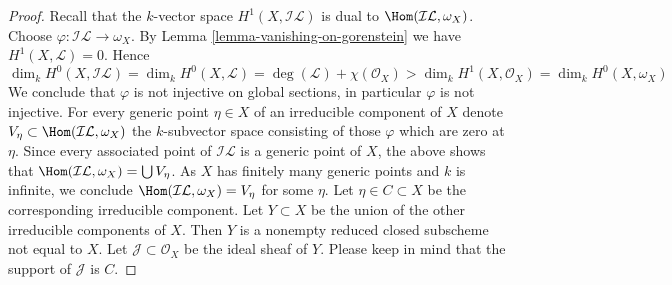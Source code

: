 \begin{proof}
\medskip\noindent
Recall that the $k$-vector space $H^1(X, \mathcal{I}\mathcal{L})$
is dual to $\Hom(\mathcal{I}\mathcal{L}, \omega_X)$.
Choose $\varphi : \mathcal{I}\mathcal{L} \to \omega_X$.
By Lemma \ref{lemma-vanishing-on-gorenstein} we have
$H^1(X, \mathcal{L}) = 0$. Hence
$$
\dim_k H^0(X, \mathcal{I}\mathcal{L}) = \dim_k H^0(X, \mathcal{L}) =
\deg(\mathcal{L}) + \chi(\mathcal{O}_X) > \dim_k H^1(X, \mathcal{O}_X) =
\dim_k H^0(X, \omega_X)
$$
We conclude that $\varphi$ is not injective on global sections, in particular
$\varphi$ is not injective. For every generic point $\eta \in X$
of an irreducible component of $X$ denote
$V_\eta \subset \Hom(\mathcal{I}\mathcal{L}, \omega_X)$ the $k$-subvector
space consisting of those $\varphi$ which are zero at $\eta$.
Since every associated point of $\mathcal{I}\mathcal{L}$
is a generic point of $X$, the above shows that
$\Hom(\mathcal{I}\mathcal{L}, \omega_X) = \bigcup V_\eta$.
As $X$ has finitely many generic points and $k$ is infinite, we conclude
$\Hom(\mathcal{I}\mathcal{L}, \omega_X) = V_\eta$ for some $\eta$.
Let $\eta \in C \subset X$ be the corresponding irreducible component.
Let $Y \subset X$ be the union of the other irreducible components
of $X$. Then $Y$ is a nonempty reduced closed subscheme not equal to $X$.
Let $\mathcal{J} \subset \mathcal{O}_X$ be the ideal sheaf of $Y$.
Please keep in mind that the support of $\mathcal{J}$ is $C$.


\end{proof}
